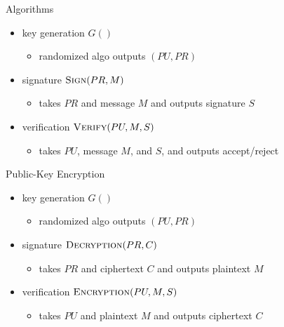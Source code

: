 \documentclass[final]{article}
\begin{document}
\begin{multicols}{2}
    Algorithms
    \begin{itemize}[nosep]
        \item key generation $G()$
              \begin{itemize}[nosep]\item randomized algo outputs $(PU, PR)$\end{itemize}
        \item signature $\textproc{Sign}(PR, M)$
              \begin{itemize}[nosep]\item takes $PR$ and message $M$ and outputs signature $S$\end{itemize}
        \item verification $\textproc{Verify}(PU, M, S)$
              \begin{itemize}[nosep]\item takes $PU$, message $M$, and $S$, and outputs accept/reject\end{itemize}
    \end{itemize}
    Public-Key Encryption
    \begin{itemize}[nosep]
        \item key generation $G()$
              \begin{itemize}[nosep]\item randomized algo outputs $(PU, PR)$\end{itemize}
        \item signature $\textproc{Decryption}(PR, C)$
              \begin{itemize}[nosep]\item takes $PR$ and ciphertext $C$ and outputs plaintext $M$\end{itemize}
        \item verification $\textproc{Encryption}(PU, M, S)$
              \begin{itemize}[nosep]\item takes $PU$ and plaintext $M$ and outputs ciphertext $C$\end{itemize}
    \end{itemize}
\end{multicols}
\end{document}
